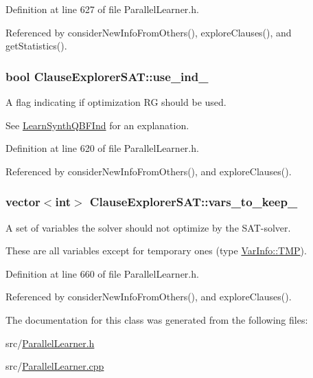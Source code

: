 Definition at line 627 of file Parallel\-Learner.\-h.



Referenced by consider\-New\-Info\-From\-Others(), explore\-Clauses(), and get\-Statistics().

\hypertarget{classClauseExplorerSAT_aca59e0b38c8a8fea9cf35d174969c41e}{
\subsubsection[{use\-\_\-ind\-\_\-}]{\setlength{\rightskip}{0pt plus 5cm}bool Clause\-Explorer\-S\-A\-T\-::use\-\_\-ind\-\_\-\hspace{0.3cm}{\ttfamily [protected]}}}\label{classClauseExplorerSAT_aca59e0b38c8a8fea9cf35d174969c41e}


A flag indicating if optimization R\-G should be used. 

See \hyperlink{classLearnSynthQBFInd}{Learn\-Synth\-Q\-B\-F\-Ind} for an explanation. 

Definition at line 620 of file Parallel\-Learner.\-h.



Referenced by consider\-New\-Info\-From\-Others(), and explore\-Clauses().

\hypertarget{classClauseExplorerSAT_a9d9c6caf1a451ed22a096c2ef5e8bbc2}{
\subsubsection[{vars\-\_\-to\-\_\-keep\-\_\-}]{\setlength{\rightskip}{0pt plus 5cm}vector$<$int$>$ Clause\-Explorer\-S\-A\-T\-::vars\-\_\-to\-\_\-keep\-\_\-\hspace{0.3cm}{\ttfamily [protected]}}}\label{classClauseExplorerSAT_a9d9c6caf1a451ed22a096c2ef5e8bbc2}


A set of variables the solver should not optimize by the S\-A\-T-\/solver. 

These are all variables except for temporary ones (type \hyperlink{classVarInfo_a64d1da76cf84fe674e5fef9764ef11cfa84a2d8d86f004930fe564dc5b395b29f}{Var\-Info\-::\-T\-M\-P}). 

Definition at line 660 of file Parallel\-Learner.\-h.



Referenced by consider\-New\-Info\-From\-Others(), and explore\-Clauses().



The documentation for this class was generated from the following files\-:\begin{DoxyCompactItemize}
\item 
src/\hyperlink{ParallelLearner_8h}{Parallel\-Learner.\-h}\item 
src/\hyperlink{ParallelLearner_8cpp}{Parallel\-Learner.\-cpp}\end{DoxyCompactItemize}

